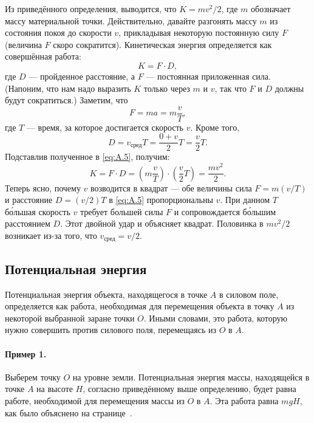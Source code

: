 Из приведённого определения, выводится, что $K = m v^2/2$, где $m$ обозначает массу материальной точки.
Действительно, давайте разгонять массу $m$ из состояния покоя до скорости $v$, прикладывая некоторую постоянную силу $F$ (величина $F$ скоро сократится).
Кинетическая энергия определяется как совершённая работа:
\begin{equation}
    K = F \cdot D,
    \label{eq:A.5}
\end{equation}
где $D$ --- пройденное расстояние, а $F$ --- постоянная приложенная сила.
(Напоним, что нам надо выразить $K$ только через $m$ и $v$,
так что $F$ и $D$ должны будут сократиться.)
Заметим, что
\[F = ma = m \frac{v}{T},\]
где $T$ --- время, за которое достигается скорость $v$.
Кроме того,
\[D = v_{\text{сред}} T = \frac{0 + v}2  T = \frac{v}2 T.\]
Подставлив полученное в \eqref{eq:A.5}, получим:
\[K = F \cdot D= \left(m \frac{v}{T}\right) \cdot\left(\frac{v}2 T\right)= \frac{m v^2}2 .\]
Теперь ясно, почему $v$ возводится в квадрат --- обе величины сила $F = m(v/T)$ и расстояние $D = (v/2)T$ в \eqref{eq:A.5} пропорциональны $v$.
При данном $T$ б\'{о}льшая скорость $v$ требует большей силы $F$ и сопровождается б\'{о}льшим расстоянием $D$.
Этот двойной удар и объясняет квадрат.
Половинка в $mv^2/2$ возникает из-за того, что $v_{\text{сред}} = v/2$.

\subsection{Потенциальная энергия}

Потенциальная энергия объекта, находящегося в точке $A$ в силовом поле, определяется как работа, необходимая для перемещения объекта в точку $A$ из некоторой выбранной заране точки $O$.
Иными словами, это работа, которую нужно совершить против силового поля, перемещаясь из $O$ в $A$.

\paragraph{Пример 1.}
Выберем точку $O$ на уровне земли.
Потенциальная энергия массы, находящейся в точке $A$ на высоте $H$,
согласно приведённому выше определению, будет равна работе,
необходимой для перемещения массы из $O$ в $A$.
Эта работа равна $mgH$, как было объяснено на странице~\pageref{Работа:Пример}.

